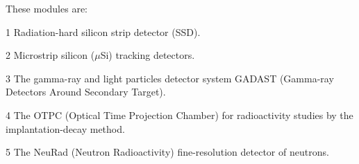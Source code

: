 \documentclass{webofc}
\begin{document}
These modules are:

\begin{inparadesc}
	\item[1] Radiation-hard silicon strip detector (SSD).
	\item[2] Microstrip silicon ($\mu$Si) tracking detectors.
	\item[3] The gamma-ray and light particles detector system GADAST (Gamma-ray Detectors Around Secondary Target).
	\item[4]  The OTPC (Optical Time Projection Chamber) for radioactivity studies by the implantation-decay method.
	\item[5]	The NeuRad (Neutron Radioactivity) fine-resolution detector of neutrons.
\end{inparadesc}
\end{document}
